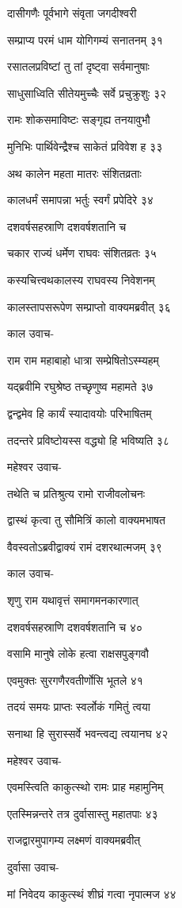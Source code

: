 दासीगणैः पूर्वभागे संवृता जगदीश्वरी

सम्प्राप्य परमं धाम योगिगम्यं सनातनम् ३१

रसातलप्रविष्टां तु तां दृष्ट्वा सर्वमानुषाः

साधुसाध्विति सीतेयमुच्चैः सर्वे प्रचुक्रुशुः ३२

रामः शोकसमाविष्टः सङ्गृह्य तनयावुभौ

मुनिभिः पार्थिवेन्द्रैश्च साकेतं प्रविवेश ह ३३

अथ कालेन महता मातरः संशितव्रताः

कालधर्मं समापन्ना भर्तुः स्वर्गं प्रपेदिरे ३४

दशवर्षसहस्राणि दशवर्षशतानि च

चकार राज्यं धर्मेण राघवः संशितव्रतः ३५

कस्यचित्त्वथकालस्य राघवस्य निवेशनम्

कालस्तापसरूपेण सम्प्राप्तो वाक्यमब्रवीत् ३६

काल उवाच-

राम राम महाबाहो धात्रा सम्प्रेषितोऽस्म्यहम्

यद्ब्रवीमि रघुश्रेष्ठ तच्छृणुष्व महामते ३७

द्वन्द्वमेव हि कार्यं स्यादावयोः परिभाषितम्

तदन्तरे प्रविष्टोयस्स वद्ध्यो हि भविष्यति ३८

महेश्वर उवाच-

तथेति च प्रतिश्रुत्य रामो राजीवलोचनः

द्वास्थं कृत्वा तु सौमित्रिं कालो वाक्यमभाषत

वैवस्वतोऽब्रवीद्वाक्यं रामं दशरथात्मजम् ३९

काल उवाच-

शृणु राम यथावृत्तं समागमनकारणात्

दशवर्षसहस्राणि दशवर्षशतानि च ४०

वसामि मानुषे लोके हत्वा राक्षसपुङ्गवौ

एवमुक्तः सुरगणैरवतीर्णोसि भूतले ४१

तदयं समयः प्राप्तः स्वर्लोकं गमितुं त्वया

सनाथा हि सुरास्सर्वे भवन्त्वद्य त्वयानघ ४२

महेश्वर उवाच-

एवमस्त्विति काकुत्स्थो रामः प्राह महामुनिम्

एतस्मिन्नन्तरे तत्र दुर्वासास्तु महातपाः ४३

राजद्वारमुपागम्य लक्ष्मणं वाक्यमब्रवीत्

दुर्वासा उवाच-

मां निवेदय काकुत्स्थं शीघ्रं गत्वा नृपात्मज ४४

